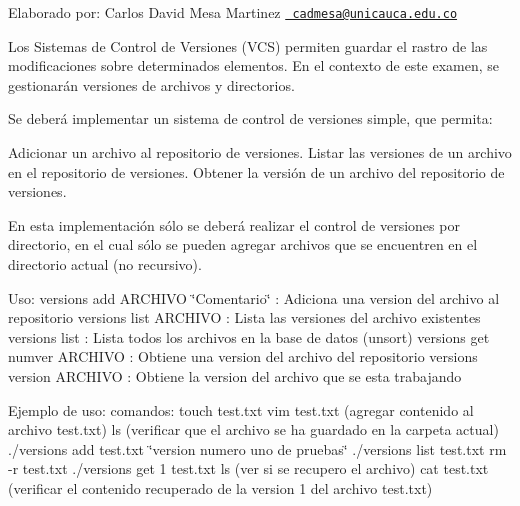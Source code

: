 Elaborado por\+: Carlos David Mesa Martinez \href{mailto:cadmesa@unicauca.edu.co}{\texttt{ cadmesa@unicauca.\+edu.\+co}}

Los Sistemas de Control de Versiones (V\+CS) permiten guardar el rastro de las modificaciones sobre determinados elementos. En el contexto de este examen, se gestionarán versiones de archivos y directorios.

Se deberá implementar un sistema de control de versiones simple, que permita\+:

Adicionar un archivo al repositorio de versiones. Listar las versiones de un archivo en el repositorio de versiones. Obtener la versión de un archivo del repositorio de versiones.

En esta implementación sólo se deberá realizar el control de versiones por directorio, en el cual sólo se pueden agregar archivos que se encuentren en el directorio actual (no recursivo).

Uso\+: versions add A\+R\+C\+H\+I\+VO \char`\"{}\+Comentario\char`\"{} \+: Adiciona una version del archivo al repositorio versions list A\+R\+C\+H\+I\+VO \+: Lista las versiones del archivo existentes versions list \+: Lista todos los archivos en la base de datos (unsort) versions get numver A\+R\+C\+H\+I\+VO \+: Obtiene una version del archivo del repositorio versions version A\+R\+C\+H\+I\+VO \+: Obtiene la version del archivo que se esta trabajando

Ejemplo de uso\+: comandos\+: touch test.\+txt vim test.\+txt (agregar contenido al archivo test.\+txt) ls (verificar que el archivo se ha guardado en la carpeta actual) ./versions add test.\+txt \char`\"{}version numero uno de pruebas\char`\"{} ./versions list test.\+txt rm -\/r test.\+txt ./versions get 1 test.\+txt ls (ver si se recupero el archivo) cat test.\+txt (verificar el contenido recuperado de la version 1 del archivo test.\+txt) 